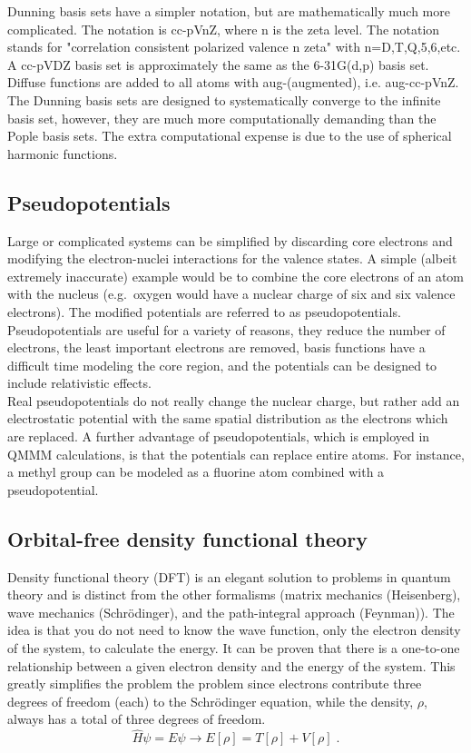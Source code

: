 \documentclass[12pt]{report}
\begin{document}
Dunning basis sets have a simpler notation, but are mathematically much more
complicated.
The notation is cc-pVnZ, where n is the zeta level.
The notation stands for "correlation consistent polarized valence n zeta"
with n=D,T,Q,5,6,etc.
A cc-pVDZ basis set is approximately the same as the 6-31G(d,p) basis set.
Diffuse functions are added to all atoms with aug-(augmented), i.e.
aug-cc-pVnZ.
The Dunning basis sets are designed to systematically converge to the infinite
basis set, however, they are much more computationally demanding than the
Pople basis sets.
The extra computational expense is due to the use of spherical harmonic
functions.

\subsection{Pseudopotentials}

Large or complicated systems can be simplified by discarding core electrons
and modifying the electron-nuclei interactions for the valence states.
A simple (albeit extremely inaccurate) example would be to combine the core
electrons of an atom with the nucleus (e.g.\ oxygen would have a nuclear charge
of six and six valence electrons).
The modified potentials are referred to as pseudopotentials.
Pseudopotentials are useful for a variety of reasons, they reduce the number
of electrons, the least important electrons are removed, basis functions have
a difficult time modeling the core region, and the potentials can be designed
to include relativistic effects. \\

Real pseudopotentials do not really change the nuclear charge, but rather add
an electrostatic potential with the same spatial distribution as the electrons
which are replaced.
A further advantage of pseudopotentials, which is employed in QMMM
calculations, is that the potentials can replace entire atoms.
For instance, a methyl group can be modeled as a fluorine atom combined with a
pseudopotential.

\subsection{Orbital-free density functional theory}

Density functional theory (DFT) is an elegant solution to problems in quantum
theory and is distinct from the other formalisms (matrix mechanics
(Heisenberg), wave mechanics (Schr\"{o}dinger), and the path-integral approach
(Feynman)).
The idea is that you do not need to know the wave function, only the electron
density of the system, to calculate the energy.
It can be proven that there is a one-to-one relationship between a given
electron density and the energy of the system.
This greatly simplifies the problem the problem since electrons contribute
three degrees of freedom (each) to the Schr\"{o}dinger equation, while the
density, $\rho$, always has a total of three degrees of freedom.
\begin{equation}
 \hat H\psi=E\psi \to E[\rho] = T[\rho]+V[\rho] \; .
\end{equation}
\end{document}

